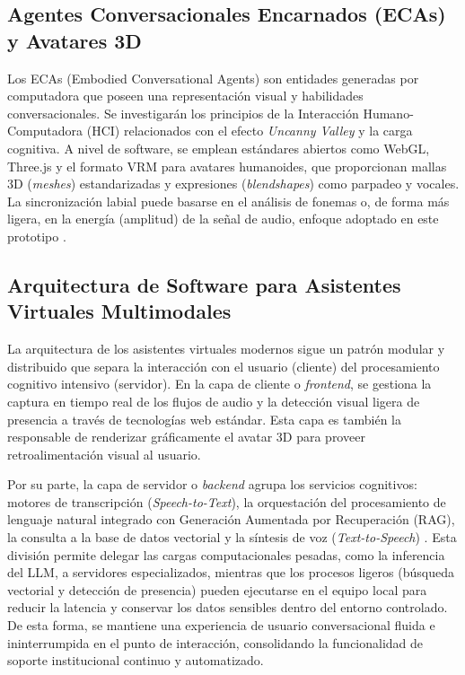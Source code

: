 \subsection{Agentes Conversacionales Encarnados (ECAs) y Avatares 3D}
Los ECAs (Embodied Conversational Agents) son entidades generadas por computadora que poseen una representación visual y habilidades conversacionales. Se investigarán los principios de la Interacción Humano-Computadora (HCI) relacionados con el efecto \textit{Uncanny Valley} y la carga cognitiva. A nivel de software, se emplean estándares abiertos como WebGL, Three.js y el formato VRM para avatares humanoides, que proporcionan mallas 3D (\textit{meshes}) estandarizadas y expresiones (\textit{blendshapes}) como parpadeo y vocales. La sincronización labial puede basarse en el análisis de fonemas o, de forma más ligera, en la energía (amplitud) de la señal de audio, enfoque adoptado en este prototipo \cite{threevrm2024}.

\subsection{Arquitectura de Software para Asistentes Virtuales Multimodales}

La arquitectura de los asistentes virtuales modernos sigue un patrón modular y distribuido que separa la interacción con el usuario (cliente) del procesamiento cognitivo intensivo (servidor). En la capa de cliente o \textit{frontend}, se gestiona la captura en tiempo real de los flujos de audio y la detección visual ligera de presencia a través de tecnologías web estándar. Esta capa es también la responsable de renderizar gráficamente el avatar 3D para proveer retroalimentación visual al usuario. 

Por su parte, la capa de servidor o \textit{backend} agrupa los servicios cognitivos: motores de transcripción (\textit{Speech-to-Text}), la orquestación del procesamiento de lenguaje natural integrado con Generación Aumentada por Recuperación (RAG), la consulta a la base de datos vectorial y la síntesis de voz (\textit{Text-to-Speech}) \cite{pabon2025naia}. Esta división permite delegar las cargas computacionales pesadas, como la inferencia del LLM, a servidores especializados, mientras que los procesos ligeros (búsqueda vectorial y detección de presencia) pueden ejecutarse en el equipo local para reducir la latencia y conservar los datos sensibles dentro del entorno controlado. De esta forma, se mantiene una experiencia de usuario conversacional fluida e ininterrumpida en el punto de interacción, consolidando la funcionalidad de soporte institucional continuo y automatizado.


